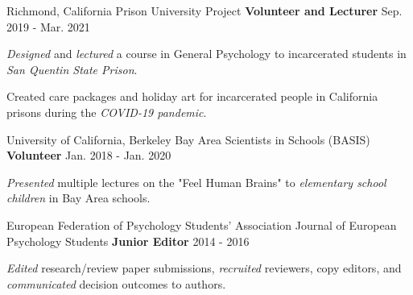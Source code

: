 \begin{cventries}
    
  \cventry
    {Richmond, California} %
    {Prison University Project}
    {\textbf{Volunteer and Lecturer}} %
    {Sep. 2019 - Mar. 2021} %
    {
      \begin{cvitems} %
        \item {\textit{Designed} and \textit{lectured} a course in General Psychology to incarcerated students in \textit{San Quentin State Prison}.}
        \item {Created care packages and holiday art for incarcerated people in California prisons during the \textit{COVID-19 pandemic}.}
      \end{cvitems}
    }
    
  \cventry
  	{University of California, Berkeley} %
  	{Bay Area Scientists in Schools (BASIS)}
    {\textbf{Volunteer}} %
    {Jan. 2018 - Jan. 2020} %
    {
      \begin{cvitems} %
        \item {\textit{Presented} multiple lectures on the "Feel Human Brains" to \textit{elementary school children} in Bay Area schools.}
      \end{cvitems}
    }
    
  \cventry
    {European Federation of Psychology Students' Association}
    {Journal of European Psychology Students} %
    {\textbf{Junior Editor}} %
    {2014 - 2016} %
    {
      \begin{cvitems} %
        \item {\textit{Edited} research/review paper submissions, \textit{recruited} reviewers, copy editors, and \textit{communicated} decision outcomes to authors.}
      \end{cvitems}
    }
    
  \cventry
    
\end{cventries}
    
